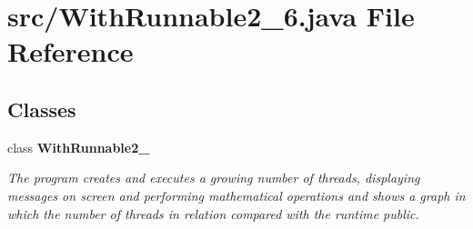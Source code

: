 \section{src/\+With\+Runnable2\+\_\+6.java File Reference}
\label{_with_runnable2__6_8java}
\subsection*{Classes}
\begin{DoxyCompactItemize}
\item 
class {\bf With\+Runnable2\+\_}
\begin{DoxyCompactList}\small\item\em The program creates and executes a growing number of threads, displaying messages on screen and performing mathematical operations and shows a graph in which the number of threads in relation compared with the runtime  public. \end{DoxyCompactList}\end{DoxyCompactItemize}
